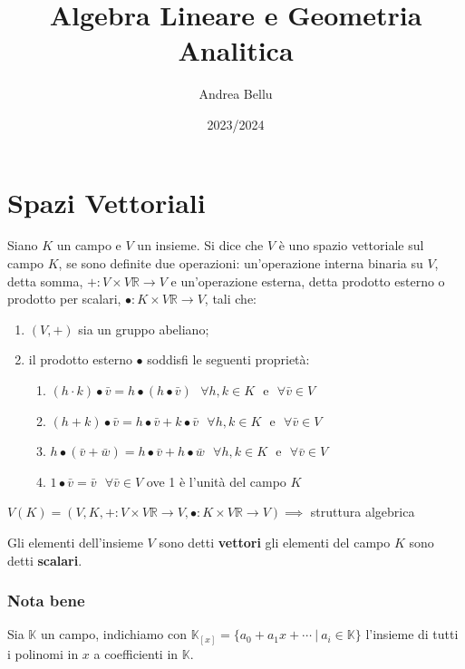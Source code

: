\documentclass{article}
\title{Algebra Lineare e Geometria Analitica}
\author{Andrea Bellu}
\date{2023/2024}
\begin{document}
\maketitle

\tableofcontents

\section{Spazi Vettoriali}
Siano $K$ un campo e $V$ un insieme. Si dice che $V$ è uno spazio vettoriale
sul campo $K$, se sono definite due operazioni: un’operazione interna binaria
su $V$, detta somma, $+: V \times V \mathbb{R}\rightarrow V$ e un’operazione
esterna, detta prodotto esterno o prodotto per scalari, $\bullet : K \times V
    \mathbb{R}\rightarrow V$, tali che:

\begin{enumerate}
    \item $(V, +)$ sia un gruppo abeliano;
    \item il prodotto esterno $\bullet$ soddisfi le seguenti proprietà:
          \begin{enumerate}
              \item $(h\cdot k)\bullet \bar{v} = h\bullet(h\bullet \bar{v}) \ \ \ \forall h,k \in K \ \ \ \text{e} \ \ \ \forall \bar{v} \in V$
              \item $(h+ k)\bullet \bar{v} = h\bullet \bar{v}+k\bullet \bar{v} \ \ \ \forall h,k \in K \ \ \ \text{e} \ \ \ \forall \bar{v} \in V$
              \item $h\bullet(\bar{v}+\bar{w}) = h\bullet\bar{v}+h\bullet\bar{w} \ \ \ \forall h,k \in K \ \ \ \text{e} \ \ \ \forall \bar{v} \in V$
              \item $1\bullet \bar{v} = \bar{v} \ \ \ \forall \bar{v} \in V$ ove 1 è l’unità del campo $K$
          \end{enumerate}
\end{enumerate}

$V(K) = (V, K, +:V\times V\mathbb{R}\rightarrow V, \bullet:K\times V\mathbb{R}\rightarrow V) \implies$ struttura algebrica

Gli elementi dell’insieme $V$ sono detti \textbf{vettori} gli elementi del
campo $K$ sono detti \textbf{scalari}.

\subsubsection{Nota bene}
Sia $\mathbb K$ un campo, indichiamo con $\mathbb K_{[x]}=\{a_0+a_1x+\cdots \ |
    \ a_i\in\mathbb K\}$ l'insieme di tutti i polinomi in $x$ a coefficienti in
$\mathbb K$.
\end{document}
